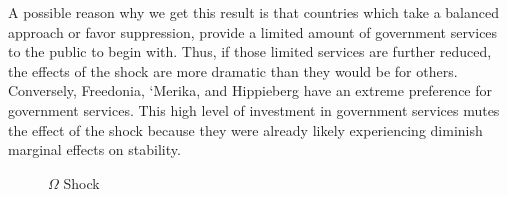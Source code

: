 \documentclass[12pt]{article}
\begin{document}
\begin{spacing}{1.5}
A possible reason why we get this result is that countries which take a balanced approach or favor suppression, provide a limited amount of government services to the public to begin with. Thus, if those limited services are further reduced, the effects of the shock are more dramatic than they would be for others. Conversely, Freedonia, `Merika, and Hippieberg have an extreme preference for government services. This high level of investment in government services mutes the effect of the shock because they were already likely experiencing diminish marginal effects on stability. 

 
\begin{figure}
\centering
{} 
\caption{$\Omega$ Shock}


\end{figure}
\end{spacing}
\end{document}
